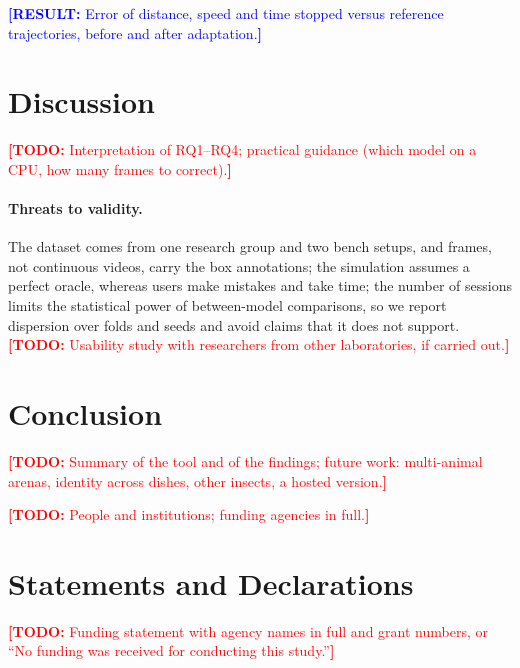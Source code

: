 \documentclass[pdflatex,sn-basic,Numbered]{sn-jnl}
\newcommand{\todo}[1]{\textcolor{red}{\textbf{[TODO:} #1\textbf{]}}}
\newcommand{\result}[1]{\textcolor{blue}{\textbf{[RESULT:} #1\textbf{]}}}
\theoremstyle{thmstyleone}%
\begin{document}
\result{Error of distance, speed and time stopped versus reference trajectories, before and after adaptation.}

\section{Discussion}\label{sec:discussion}

\todo{Interpretation of RQ1--RQ4; practical guidance (which model on a CPU, how many frames to correct).}

\paragraph{Threats to validity.} The dataset comes from one research group and two bench setups, and frames, not continuous videos, carry the box annotations; the simulation assumes a perfect oracle, whereas users make mistakes and take time; the number of sessions limits the statistical power of between-model comparisons, so we report dispersion over folds and seeds and avoid claims that it does not support. \todo{Usability study with researchers from other laboratories, if carried out.}

\section{Conclusion}\label{sec:conclusion}

\todo{Summary of the tool and of the findings; future work: multi-animal arenas, identity across dishes, other insects, a hosted version.}

\backmatter

\todo{People and institutions; funding agencies in full.}

\section*{Statements and Declarations}

\todo{Funding statement with agency names in full and grant numbers, or ``No funding was received for conducting this study.''}
\end{document}

